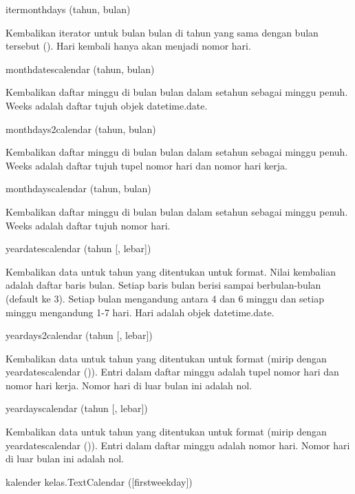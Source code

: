 \noindent 
itermonthdays (tahun, bulan) \par
\noindent 
Kembalikan iterator untuk bulan bulan di tahun yang sama dengan bulan tersebut (). Hari kembali hanya akan menjadi nomor hari. \par
\vspace{12pt}
\noindent 
monthdatescalendar (tahun, bulan) \par
\noindent 
Kembalikan daftar minggu di bulan bulan dalam setahun sebagai minggu penuh. Weeks adalah daftar tujuh objek datetime.date. \par
\vspace{12pt}
\noindent 
monthdays2calendar (tahun, bulan) \par
\noindent 
Kembalikan daftar minggu di bulan bulan dalam setahun sebagai minggu penuh. Weeks adalah daftar tujuh tupel nomor hari dan nomor hari kerja. \par
\vspace{12pt}
\noindent 
monthdayscalendar (tahun, bulan) \par
\noindent 
Kembalikan daftar minggu di bulan bulan dalam setahun sebagai minggu penuh. Weeks adalah daftar tujuh nomor hari. \par
\vspace{12pt}
\noindent 
yeardatescalendar (tahun [, lebar]) \par
\noindent 
Kembalikan data untuk tahun yang ditentukan untuk format. Nilai kembalian adalah daftar baris bulan. Setiap baris bulan berisi sampai berbulan-bulan (default ke 3). Setiap bulan mengandung antara 4 dan 6 minggu dan setiap minggu mengandung 1-7 hari. Hari adalah objek datetime.date. \par
\vspace{12pt}
\noindent 
yeardays2calendar (tahun [, lebar]) \par
\noindent 
Kembalikan data untuk tahun yang ditentukan untuk format (mirip dengan yeardatescalendar ()). Entri dalam daftar minggu adalah tupel nomor hari dan nomor hari kerja. Nomor hari di luar bulan ini adalah nol. \par
\vspace{12pt}
\noindent 
yeardayscalendar (tahun [, lebar]) \par
\noindent 
Kembalikan data untuk tahun yang ditentukan untuk format (mirip dengan yeardatescalendar ()). Entri dalam daftar minggu adalah nomor hari. Nomor hari di luar bulan ini adalah nol. \par
\vspace{12pt}
\noindent 
kalender kelas.TextCalendar ([firstweekday]) \par
